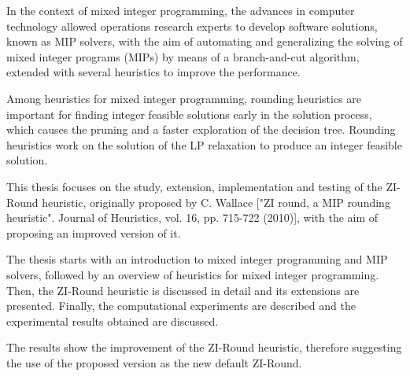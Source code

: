 \documentclass[a4paper,12pt,twoside]{scrbook}
\begin{document}
In the context of mixed integer programming, the advances in computer technology allowed operations research experts to develop software solutions, known as MIP solvers, with the aim of automating and generalizing the solving of mixed integer programs (MIPs) by means of a branch-and-cut algorithm, extended with several heuristics to improve the performance. \par 
Among heuristics for mixed integer programming, rounding heuristics are important for finding integer feasible solutions early in the solution process, which causes the pruning and a faster exploration of the decision tree. Rounding heuristics work on the solution of the LP relaxation to produce an integer feasible solution. \par 
This thesis focuses on the study, extension, implementation and testing of the ZI-Round heuristic, originally proposed by C. Wallace ["ZI round, a MIP rounding heuristic". Journal of Heuristics, vol. 16, pp. 715-722 (2010)], with the aim of proposing an improved version of it. \par 
The thesis starts with an introduction to mixed integer programming and MIP solvers, followed by an overview of heuristics for mixed integer programming. Then, the ZI-Round heuristic is discussed in detail and its extensions are presented. Finally, the computational experiments are described and the experimental results obtained are discussed. \par 
The results show the improvement of the ZI-Round heuristic, therefore suggesting the use of the proposed version as the new default ZI-Round.
	
\tableofcontents

\pagestyle{headings}

\mainmatter
\end{document}
